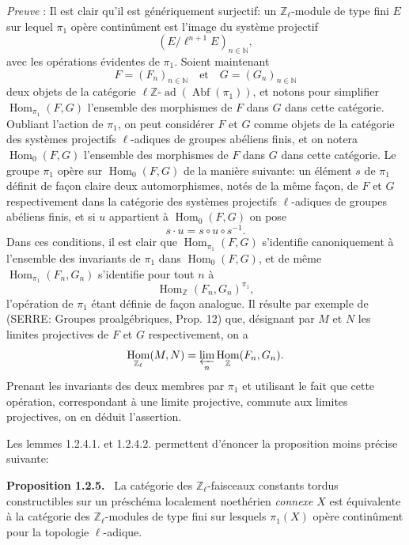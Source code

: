 \documentclass[11pt]{article}
\newenvironment{statement}[1]{\par\medskip\noindent\textbf{#1.}\ }{\par\medskip}
\DeclareMathOperator{\Hom}{Hom}
\providecommand{\Hom}{\operatorname{Hom}}
\providecommand{\Abf}{\operatorname{Abf}}
\providecommand{\ad}{\operatorname{ad}}
\providecommand{\Hom}{\operatorname{Hom}}
\begin{document}
\emph{Preuve} : Il est clair qu'il est génériquement surjectif: un \(\mathbb Z_\ell\)-module de type fini \(E\) sur lequel \(\pi_1\) opère continûment est l'image du système projectif
\[
(E/\ell^{n+1}E)_{n\in\mathbb N},
\]
avec les opérations évidentes de \(\pi_1\). Soient maintenant
\[
F=(F_n)_{n\in\mathbb N}\quad\text{et}\quad G=(G_n)_{n\in\mathbb N}
\]
deux objets de la catégorie \(\ell\mathbb Z\text{-}\ad(\Abf(\pi_1))\), et notons pour simplifier \(\Hom_{\pi_1}(F,G)\) l'ensemble des morphismes de \(F\) dans \(G\) dans cette
catégorie. Oubliant l'action de \(\pi_1\), on peut considérer \(F\) et \(G\) comme objets de la catégorie des systèmes projectifs \(\ell\)-adiques de groupes abéliens finis, et on notera \(\Hom_0(F,G)\) l'ensemble des morphismes de \(F\) dans \(G\) dans cette catégorie. Le groupe \(\pi_1\) opère sur \(\Hom_0(F,G)\) de la manière suivante: un élément \(s\) de \(\pi_1\) définit de façon claire deux automorphismes, notés de la même façon, de \(F\) et \(G\) respectivement dans la catégorie des systèmes projectifs \(\ell\)-adiques de groupes abéliens finis, et si \(u\) appartient à \(\Hom_0(F,G)\) on pose
\[
s\cdot u=s\circ u\circ s^{-1}.
\]
Dans ces conditions, il est clair que \(\Hom_{\pi_1}(F,G)\) s'identifie canoniquement à l'ensemble des invariants de \(\pi_1\) dans \(\Hom_0(F,G)\), et de même \(\Hom_{\pi_1}(F_n,G_n)\) s'identifie pour tout \(n\) à
\[
\Hom_{\mathbb Z}(F_n,G_n)^{\pi_1},
\]
l'opération de \(\pi_1\) étant définie de façon analogue. Il résulte par exemple de (SERRE: Groupes proalgébriques, Prop. 12) que, désignant par \(M\) et \(N\) les limites projectives de \(F\) et \(G\) respectivement, on a
\[
\Hom_{\mathbb Z_\ell}(M,N)=\varprojlim_n\Hom_{\mathbb Z}(F_n,G_n).
\]
Prenant les invariants des deux membres par \(\pi_1\) et utilisant le fait que cette opération, correspondant à une limite projective, commute aux limites projectives, on en déduit l'assertion.

Les lemmes 1.2.4.1. et 1.2.4.2. permettent d'énoncer la proposition moins précise suivante:

\begin{statement}{Proposition 1.2.5}
La catégorie des \(\mathbb Z_\ell\)-faisceaux constants tordus constructibles sur un préschéma localement noethérien \emph{connexe} \(X\) est équivalente à la catégorie des \(\mathbb Z_\ell\)-modules de type fini sur lesquels \(\pi_1(X)\) opère continûment pour la topologie \(\ell\)-adique.
\end{statement}
\end{document}
